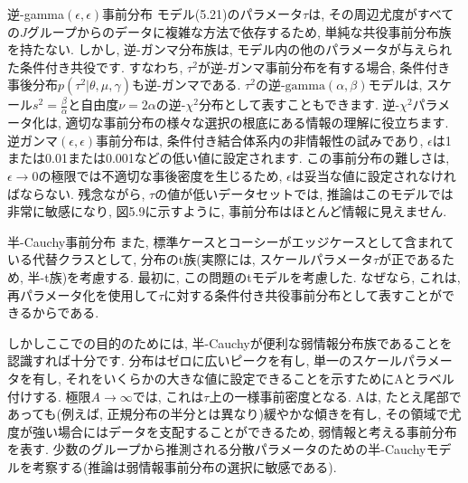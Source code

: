 \documentclass[10pt,dvipdfmx,a4]{beamer}
\begin{document}
\begin{frame}{逆-gamma$(\epsilon,\epsilon)$事前分布}
モデル(5.21)のパラメータ$\tau$は, その周辺尤度がすべての$J$グループからのデータに複雑な方法で依存するため, 単純な共役事前分布族を持たない.
しかし, 逆-ガンマ分布族は, モデル内の他のパラメータが与えられた条件付き共役です.
すなわち, $\tau^2$が逆-ガンマ事前分布を有する場合, 条件付き事後分布$p(\tau^2|\theta,\mu, \gamma)$も逆-ガンマである.
$\tau^2$の逆-$\text{gamma}(\alpha,\beta)$モデルは, スケール$s^2=\frac{\beta}{\alpha}$と自由度$\nu=2\alpha$の逆-$\chi^2$分布として表すこともできます.
逆-$\chi^2$パラメータ化は, 適切な事前分布の様々な選択の根底にある情報の理解に役立ちます.
逆ガンマ$(\epsilon,\epsilon)$事前分布は, 条件付き結合体系内の非情報性の試みであり, $\epsilon$は1または0.01または0.001などの低い値に設定されます.
この事前分布の難しさは, $\epsilon \rightarrow0$の極限では不適切な事後密度を生じるため, $\epsilon$は妥当な値に設定されなければならない.
残念ながら, $\tau$の値が低いデータセットでは, 推論はこのモデルでは非常に敏感になり, 図5.9に示すように, 事前分布はほとんど情報に見えません.
\end{frame}


\begin{frame}{半-Cauchy事前分布}
また, 標準ケースとコーシーがエッジケースとして含まれている代替クラスとして, 分布のt族(実際には, スケールパラメータ$\tau$が正であるため, 半-t族)を考慮する.
最初に, この問題のtモデルを考慮した.
なぜなら, これは, 再パラメータ化を使用して$\tau$に対する条件付き共役事前分布として表すことができるからである.

しかしここでの目的のためには, 半-Cauchyが便利な弱情報分布族であることを認識すれば十分です.
分布はゼロに広いピークを有し, 単一のスケールパラメータを有し, それをいくらかの大きな値に設定できることを示すためにAとラベル付けする.
極限$A\rightarrow \infty$では, これは$\tau$上の一様事前密度となる.
Aは, たとえ尾部であっても(例えば, 正規分布の半分とは異なり)緩やかな傾きを有し, その領域で尤度が強い場合にはデータを支配することができるため, 弱情報と考える事前分布を表す.
少数のグループから推測される分散パラメータのための半-Cauchyモデルを考察する(推論は弱情報事前分布の選択に敏感である).
\end{frame}

\end{document}
